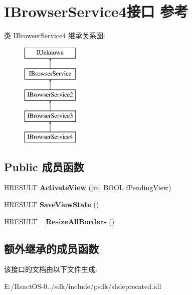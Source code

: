 \hypertarget{interface_i_browser_service4}{}\section{I\+Browser\+Service4接口 参考}
\label{interface_i_browser_service4}
类 I\+Browser\+Service4 继承关系图\+:\begin{figure}[H]
\begin{center}
\leavevmode
\includegraphics[height=5.000000cm]{interface_i_browser_service4}
\end{center}
\end{figure}
\subsection*{Public 成员函数}
\begin{DoxyCompactItemize}
\item 
\mbox{\label{interface_i_browser_service4_aaf57b55a23fb4ce68ca44d075af7b913}} 
H\+R\+E\+S\+U\+LT {\bfseries Activate\+View} (\mbox{[}in\mbox{]} B\+O\+OL f\+Pending\+View)
\item 
\mbox{\label{interface_i_browser_service4_a278d6cccd390daeb12707ac2a60a388c}} 
H\+R\+E\+S\+U\+LT {\bfseries Save\+View\+State} ()
\item 
\mbox{\label{interface_i_browser_service4_acd45cf8fb4af530c545368b5f3770d5f}} 
H\+R\+E\+S\+U\+LT {\bfseries \+\_\+\+Resize\+All\+Borders} ()
\end{DoxyCompactItemize}
\subsection*{额外继承的成员函数}


该接口的文档由以下文件生成\+:\begin{DoxyCompactItemize}
\item 
E\+:/\+React\+O\+S-\/0../sdk/include/psdk/shdeprecated.\+idl\end{DoxyCompactItemize}
